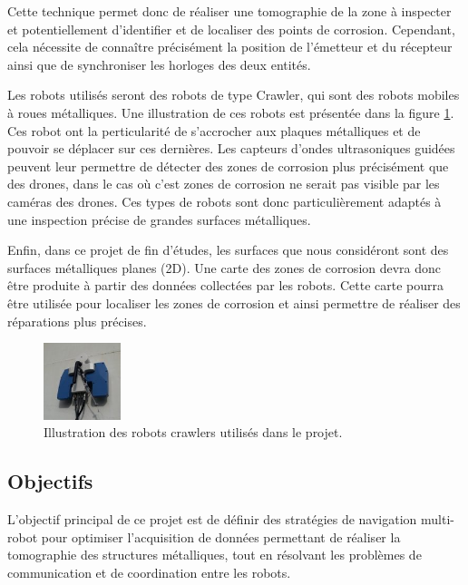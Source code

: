 \documentclass[init,francais,RandD]{rapportPFE}  %
\begin{document}
			Cette technique permet donc de réaliser une tomographie de la zone à inspecter et potentiellement d'identifier et de localiser des points de corrosion. Cependant, cela nécessite de connaître précisément la position de l'émetteur et du récepteur ainsi que de synchroniser les horloges des deux entités.

			Les robots utilisés seront des robots de type Crawler, qui sont des robots mobiles à roues métalliques. Une illustration de ces robots est présentée dans la figure \ref{fig:robots}. Ces robot ont la perticularité de s'accrocher aux plaques métalliques et de pouvoir se déplacer sur ces dernières. Les capteurs d'ondes ultrasoniques guidées peuvent leur permettre de détecter des zones de corrosion plus précisément que des drones, dans le cas où c'est zones de corrosion ne serait pas visible par les caméras des drones. Ces types de robots sont donc particulièrement adaptés à une inspection précise de grandes surfaces métalliques.

			Enfin, dans ce projet de fin d'études, les surfaces que nous considéront sont des surfaces métalliques planes (2D). Une carte des zones de corrosion devra donc être produite à partir des données collectées par les robots. Cette carte pourra être utilisée pour localiser les zones de corrosion et ainsi permettre de réaliser des réparations plus précises.

			\begin{figure}[h]
				\centering
				\includegraphics[width=0.2\textwidth]{graphics/altiscan_closeup-150x150.jpg}
				\caption{Illustration des robots crawlers utilisés dans le projet.}
				\label{fig:robots}
			\end{figure}
		\subsection{Objectifs}
			L'objectif principal de ce projet est de définir des stratégies de navigation multi-robot pour optimiser l'acquisition de données permettant de réaliser la tomographie des structures métalliques, tout en résolvant les problèmes de communication et de coordination entre les robots.
\end{document}
